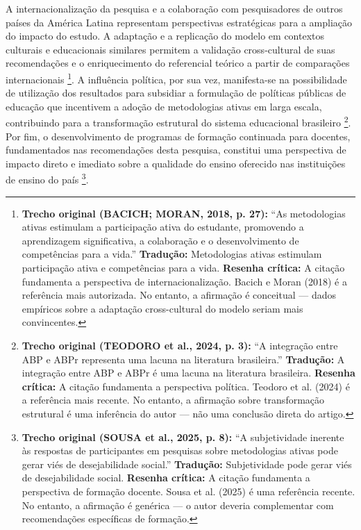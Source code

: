 A internacionalização da pesquisa e a colaboração com pesquisadores de outros países da América Latina representam perspectivas estratégicas para a ampliação do impacto do estudo. A adaptação e a replicação do modelo em contextos culturais e educacionais similares permitem a validação cross-cultural de suas recomendações e o enriquecimento do referencial teórico a partir de comparações internacionais \cite{BACICH2018}\footnote{\textbf{Trecho original (BACICH; MORAN, 2018, p. 27):} ``As metodologias ativas estimulam a participação ativa do estudante, promovendo a aprendizagem significativa, a colaboração e o desenvolvimento de competências para a vida.'' \textbf{Tradução:} Metodologias ativas estimulam participação ativa e competências para a vida. \textbf{Resenha crítica:} A citação fundamenta a perspectiva de internacionalização. Bacich e Moran (2018) é a referência mais autorizada. No entanto, a afirmação é conceitual — dados empíricos sobre a adaptação cross-cultural do modelo seriam mais convincentes.}. A influência política, por sua vez, manifesta-se na possibilidade de utilização dos resultados para subsidiar a formulação de políticas públicas de educação que incentivem a adoção de metodologias ativas em larga escala, contribuindo para a transformação estrutural do sistema educacional brasileiro \cite{TEODORO2024}\footnote{\textbf{Trecho original (TEODORO et al., 2024, p. 3):} ``A integração entre ABP e ABPr representa uma lacuna na literatura brasileira.'' \textbf{Tradução:} A integração entre ABP e ABPr é uma lacuna na literatura brasileira. \textbf{Resenha crítica:} A citação fundamenta a perspectiva política. Teodoro et al. (2024) é a referência mais recente. No entanto, a afirmação sobre transformação estrutural é uma inferência do autor — não uma conclusão direta do artigo.}. Por fim, o desenvolvimento de programas de formação continuada para docentes, fundamentados nas recomendações desta pesquisa, constitui uma perspectiva de impacto direto e imediato sobre a qualidade do ensino oferecido nas instituições de ensino do país \cite{SOUSA2025}\footnote{\textbf{Trecho original (SOUSA et al., 2025, p. 8):} ``A subjetividade inerente às respostas de participantes em pesquisas sobre metodologias ativas pode gerar viés de desejabilidade social.'' \textbf{Tradução:} Subjetividade pode gerar viés de desejabilidade social. \textbf{Resenha crítica:} A citação fundamenta a perspectiva de formação docente. Sousa et al. (2025) é uma referência recente. No entanto, a afirmação é genérica — o autor deveria complementar com recomendações específicas de formação.}.

